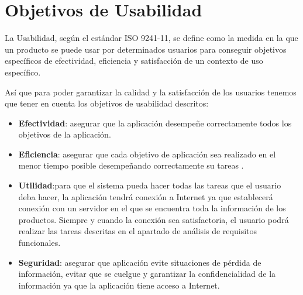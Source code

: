 \section{Objetivos de Usabilidad}

La Usabilidad, según el estándar ISO 9241-11, se define como la medida en la que un producto se puede usar por determinados usuarios para conseguir objetivos específicos de efectividad, eficiencia y satisfacción de un contexto de uso específico.  

Así que para poder garantizar la calidad y la satisfacción de los usuarios tenemos que tener en cuenta los objetivos de usabilidad descritos:  

\begin{itemize}
	\item {\bfseries Efectividad}: asegurar que la aplicación desempeñe correctamente todos los objetivos de la aplicación.  	
	\item {\bfseries Eficiencia}: asegurar que cada objetivo de aplicación sea realizado en el menor tiempo posible desempeñando correctamente su tareas .
	\item {\bfseries Utilidad}:para que el sistema pueda hacer todas las tareas que el usuario deba hacer, la aplicación tendrá conexión a Internet ya que establecerá conexión con un servidor en el que se encuentra toda la información de los productos. Siempre y cuando la conexión sea satisfactoria, el usuario podrá realizar las tareas descritas en el apartado de análisis de requisitos funcionales. 
	\item {\bfseries Seguridad}: asegurar que aplicación evite situaciones de pérdida de información, evitar que se cuelgue y garantizar la confidencialidad de la información ya que la aplicación tiene acceso a Internet.
\end{itemize}	 

